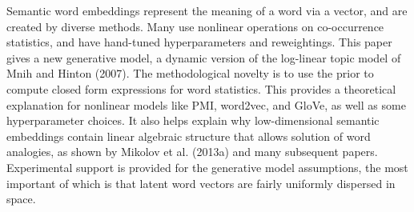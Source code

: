 Semantic word embeddings represent the meaning of a word via a vector, and are created by diverse methods. Many use nonlinear operations on co-occurrence statistics, and have hand-tuned hyperparameters and reweightings. This paper gives a new generative model, a dynamic version of the log-linear topic model of Mnih and Hinton (2007). The methodological novelty is to use the prior to compute closed form expressions for word statistics. This provides a theoretical explanation for nonlinear models like PMI, word2vec, and GloVe, as well as some hyperparameter choices. It also helps explain why low-dimensional semantic embeddings contain linear algebraic structure that allows solution of word analogies, as shown by Mikolov et al. (2013a) and many subsequent papers. Experimental support is provided for the generative model assumptions, the most important of which is that latent word vectors are fairly uniformly dispersed in space.
